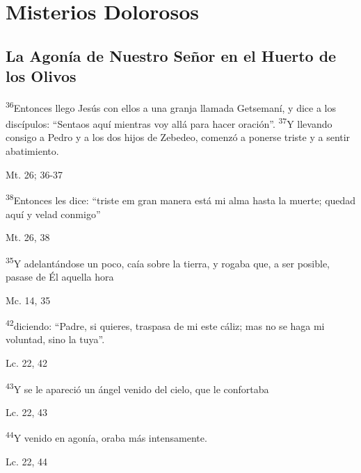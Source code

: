 \documentclass[a4paper,11pt]{article}
\begin{document}
    \newpage
        
  \section*{\hfil Misterios Dolorosos \hfil}
    \subsection*{\hfil La Agonía de Nuestro Señor en el Huerto de los Olivos \hfil}
      
      \textsuperscript{36}Entonces llego Jesús con ellos a una granja llamada Getsemaní, y dice a los discípulos: ``Sentaos aquí mientras voy allá para hacer oración''. 
      \textsuperscript{37}Y llevando consigo a Pedro y a los dos hijos de Zebedeo, comenzó a ponerse triste y a sentir abatimiento.
      \begin{flushright}
        Mt. 26; 36-37     
      \end{flushright}

      \textsuperscript{38}Entonces les dice: ``triste em gran manera está mi alma hasta la muerte; quedad aquí y velad conmigo''
      \begin{flushright}
        Mt. 26, 38
      \end{flushright}

      \textsuperscript{35}Y adelantándose un poco, caía sobre la tierra, y rogaba que, a ser posible, pasase de Él aquella hora
      \begin{flushright}
        Mc. 14, 35  
      \end{flushright}

      \textsuperscript{42}diciendo: ``Padre, si quieres, traspasa de mi este cáliz; mas no se haga mi voluntad, sino la tuya''.
      \begin{flushright}
        Lc. 22, 42
      \end{flushright}

      \textsuperscript{43}Y se le apareció un ángel venido del cielo, que le confortaba
      \begin{flushright}
        Lc. 22, 43
      \end{flushright}

      \textsuperscript{44}Y venido en agonía, oraba más intensamente. 
      \begin{flushright}
        Lc. 22, 44
      \end{flushright}
\end{document}
